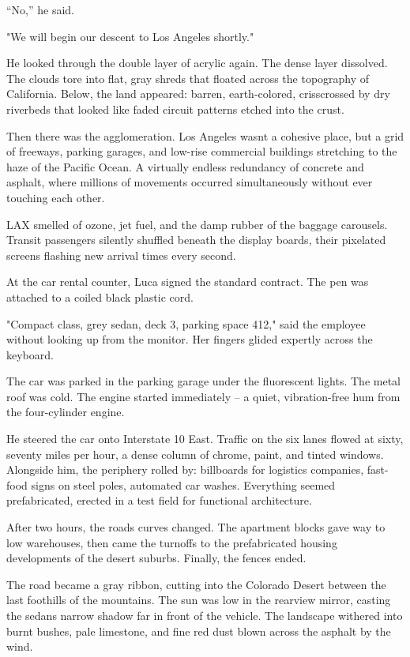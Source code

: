 \documentclass[
  ngerman,
]{article}
\begin{document}
``No,'' he said.

"We will begin our descent to Los Angeles shortly."

He looked through the double layer of acrylic again. The dense layer
dissolved. The clouds tore into flat, gray shreds that floated across
the topography of California. Below, the land appeared: barren,
earth-colored, crisscrossed by dry riverbeds that looked like faded
circuit patterns etched into the crust.

Then there was the agglomeration. Los Angeles wasn\textquotesingle t a
cohesive place, but a grid of freeways, parking garages, and low-rise
commercial buildings stretching to the haze of the Pacific Ocean. A
virtually endless redundancy of concrete and asphalt, where millions of
movements occurred simultaneously without ever touching each other.

LAX smelled of ozone, jet fuel, and the damp rubber of the baggage
carousels. Transit passengers silently shuffled beneath the display
boards, their pixelated screens flashing new arrival times every second.

At the car rental counter, Luca signed the standard contract. The pen
was attached to a coiled black plastic cord.

"Compact class, grey sedan, deck 3, parking space 412," said the
employee without looking up from the monitor. Her fingers glided
expertly across the keyboard.

The car was parked in the parking garage under the fluorescent lights.
The metal roof was cold. The engine started immediately -- a quiet,
vibration-free hum from the four-cylinder engine.

He steered the car onto Interstate 10 East. Traffic on the six lanes
flowed at sixty, seventy miles per hour, a dense column of chrome,
paint, and tinted windows. Alongside him, the periphery rolled by:
billboards for logistics companies, fast-food signs on steel poles,
automated car washes. Everything seemed prefabricated, erected in a test
field for functional architecture.

After two hours, the road\textquotesingle s curves changed. The
apartment blocks gave way to low warehouses, then came the turnoffs to
the prefabricated housing developments of the desert suburbs. Finally,
the fences ended.

The road became a gray ribbon, cutting into the Colorado Desert between
the last foothills of the mountains. The sun was low in the rearview
mirror, casting the sedan\textquotesingle s narrow shadow far in front
of the vehicle. The landscape withered into burnt bushes, pale
limestone, and fine red dust blown across the asphalt by the wind.
\end{document}
